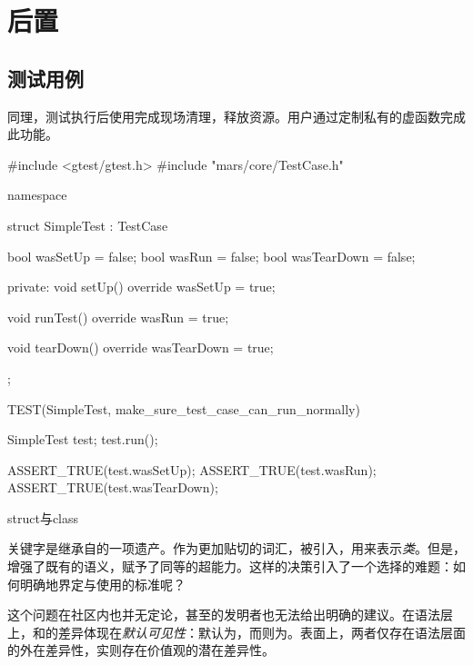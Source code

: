 \section{后置}

\begin{content}

\subsection{测试用例}

同理，测试执行后使用完成现场清理，释放资源。用户通过定制私有的虚函数完成此功能。

\begin{leftbar}
 \begin{c++}[caption={\ttfamily{test/mars/core/TestCaseSpec.cc}}]
#include <gtest/gtest.h>
#include "mars/core/TestCase.h"

namespace {
  struct SimpleTest : TestCase {
    bool wasSetUp = false;
    bool wasRun = false;
    bool wasTearDown = false;

  private:
    void setUp() override {
      wasSetUp = true;
    }

    void runTest() override {
      wasRun = true;
    }

    void tearDown() override {
      wasTearDown = true;
    }
  };
}

TEST(SimpleTest, make_sure_test_case_can_run_normally) {
  SimpleTest test;
  test.run();

  ASSERT_TRUE(test.wasSetUp);
  ASSERT_TRUE(test.wasRun);
  ASSERT_TRUE(test.wasTearDown);  
}
 \end{c++}
\end{leftbar}

\begin{episode}{struct与class}
\begin{content}

关键字是\cpp{}继承自\clang{}的一项遗产。作为更加贴切的词汇，被引入\cpp{}，用来表示\emph{类}。但是，\cpp{}增强了既有的语义，赋予了同等的超能力。这样的决策引入了一个选择的难题：如何明确地界定与使用的标准呢？

这个问题在社区内也并无定论，甚至\cpp{}的发明者也无法给出明确的建议。在语法层上，和的差异体现在\emph{默认可见性}：默认为，而则为。表面上，两者仅存在语法层面的外在差异性，实则存在价值观的潜在差异性。


\end{content}
\end{episode}
\end{content}
